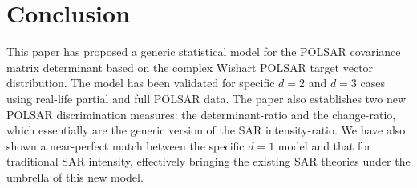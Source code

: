 \documentclass[printer]{tRSL2e}
\begin{document}
%

\section{Conclusion}
\label{sec:conclusion}

This paper has proposed a generic statistical model  for the POLSAR covariance matrix determinant based on the complex Wishart POLSAR target vector distribution.%
The model has been validated for specific $d=2$ and $d=3$ cases using real-life partial and full POLSAR data.
The paper also establishes two new POLSAR discrimination measures: the determinant-ratio and the change-ratio,  which essentially are the generic version of the SAR intensity-ratio.
We have also shown a near-perfect match between the specific $d=1$ model and that for traditional SAR intensity,
  effectively bringing the existing SAR theories under the umbrella of this new model.
\end{document}
